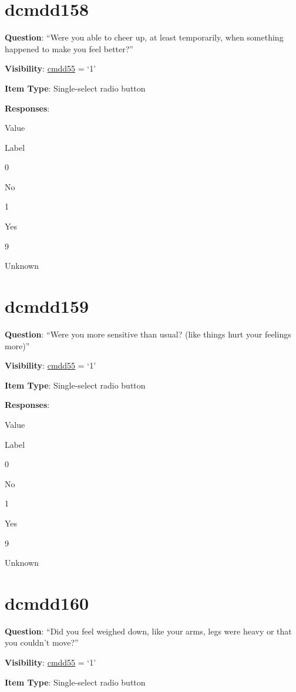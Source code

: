 \documentclass[]{book}
\begin{document}
\hypertarget{dcmdd158}{%
\section{dcmdd158}\label{dcmdd158}}

\textbf{Question}: ``Were you able to cheer up, at least temporarily, when something happened to make you feel better?''

\textbf{Visibility}: \protect\hyperlink{cmdd55}{cmdd55} = `1'

\textbf{Item Type}: Single-select radio button

\textbf{Responses}:

Value

Label

0

No

1

Yes

9

Unknown

\hypertarget{dcmdd159}{%
\section{dcmdd159}\label{dcmdd159}}

\textbf{Question}: ``Were you more sensitive than usual? (like things hurt your feelings more)''

\textbf{Visibility}: \protect\hyperlink{cmdd55}{cmdd55} = `1'

\textbf{Item Type}: Single-select radio button

\textbf{Responses}:

Value

Label

0

No

1

Yes

9

Unknown

\hypertarget{dcmdd160}{%
\section{dcmdd160}\label{dcmdd160}}

\textbf{Question}: ``Did you feel weighed down, like your arms, legs were heavy or that you couldn't move?''

\textbf{Visibility}: \protect\hyperlink{cmdd55}{cmdd55} = `1'

\textbf{Item Type}: Single-select radio button
\end{document}
